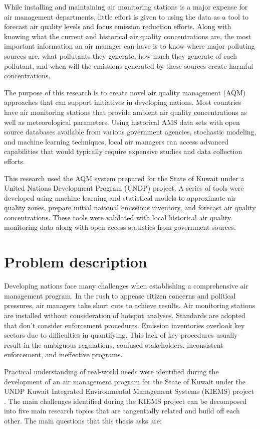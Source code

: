 While installing and maintaining air monitoring stations is a major expense for air management departments,  little effort is given to using the data as a tool to forecast air quality levels and focus emission reduction efforts. Along with knowing what the current and historical air quality concentrations are, the most important information an air manager can have is to know where major polluting sources are, what pollutants they generate, how much they generate of each pollutant, and when will the emissions generated by these sources create harmful concentrations.

The purpose of this research is to create novel air quality management (AQM) approaches that can support initiatives in developing nations. Most countries have air monitoring stations that provide ambient air quality concentrations as well as meteorological parameters. Using historical AMS data sets with open source databases available from various government agencies, stochastic modeling, and machine learning techniques, local air managers can access advanced capabilities that would typically require expensive studies and data collection efforts.

This research used the AQM system prepared for the State of Kuwait under a United Nations Development Program (UNDP) project. A series of tools were developed using machine learning and statistical models to approximate air quality zones, prepare initial national emissions inventory, and forecast air quality concentrations.  These tools were validated with local historical air quality monitoring data along with open access statistics from government sources.

\section{Problem description}

Developing nations face many challenges when establishing a comprehensive air management program. In the rush to appease citizen concerns and political pressures, air managers take short cuts to achieve results. Air monitoring stations are installed without consideration of hotspot analyses. Standards are adopted that don't consider enforcement procedures. Emission inventories overlook key sectors due to difficulties in quantifying. This lack of key procedures usually result in the ambiguous regulations, confused stakeholders, inconsistent enforcement, and ineffective programs.

Practical understanding of real-world needs were identified during the development of an air management program for the State of Kuwait under the UNDP Kuwait Integrated Environmental Management Systems (KIEMS) project \citep{UNDP2012}.  The main challenges identified during the KIEMS project can be decomposed into five main research topics that are tangentially related and build off each other. The main questions that this thesis asks are:

